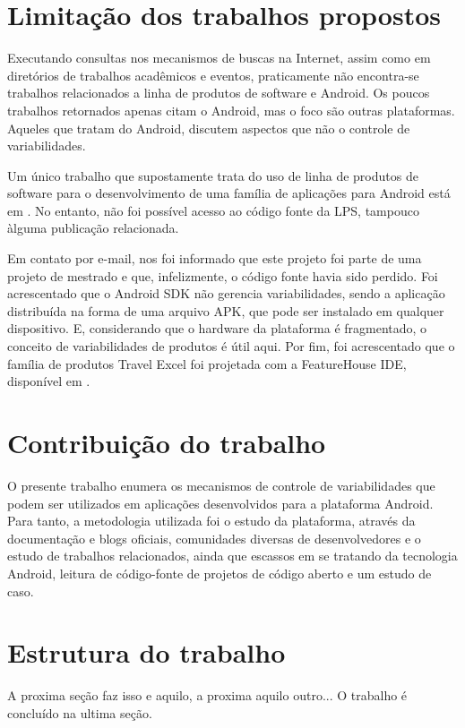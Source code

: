 
\section{Limitação dos trabalhos propostos}
Executando consultas nos mecanismos de buscas na Internet, assim como em diretórios 
de trabalhos acadêmicos e eventos, praticamente não encontra-se trabalhos relacionados
a linha de produtos de software e Android. Os poucos trabalhos retornados apenas citam
o Android, mas o foco são outras plataformas. Aqueles que tratam do Android, discutem 
aspectos que não o controle de variabilidades.

Um único trabalho que supostamente trata do uso de linha de produtos de software
para o desenvolvimento de uma família de aplicações para Android está em \cite{gnios}.
No entanto, não foi possível acesso ao código fonte da LPS, tampouco àlguma publicação
relacionada. 

Em contato por e-mail, nos foi informado que este projeto foi parte de uma
projeto de mestrado e que, infelizmente, o código fonte havia sido perdido. Foi 
acrescentado que o Android SDK não gerencia variabilidades, sendo a aplicação distribuída 
na forma de uma arquivo APK, que pode ser instalado em qualquer dispositivo. E, 
considerando que o hardware da plataforma é fragmentado, o conceito de variabilidades
de produtos é útil aqui. Por fim, foi acrescentado que o família de produtos Travel
Excel foi projetada com a FeatureHouse IDE, disponível em \cite{featurehouse}.

\section{Contribuição do trabalho}
O presente trabalho enumera os mecanismos de controle de variabilidades que podem
ser utilizados em aplicações desenvolvidos para a plataforma Android. Para tanto, 
a metodologia utilizada foi o estudo da plataforma, através da documentação e 
blogs oficiais, comunidades diversas de desenvolvedores e o estudo de trabalhos 
relacionados, ainda que escassos em se tratando da tecnologia Android, leitura de 
código-fonte de projetos de código aberto e um estudo de caso.

\section{Estrutura do trabalho}
A proxima seção faz isso e aquilo, a proxima aquilo outro... O trabalho é concluído 
na ultima seção.

